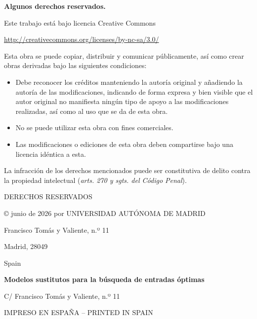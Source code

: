 \clearpage
\thispagestyle{empty}

\vspace*{1.5cm}

\begingroup
\small
\setlength{\parindent}{0pt}

\textbf{Algunos derechos reservados.}

\vspace{0.4cm}

Este trabajo está bajo licencia Creative Commons

\vspace{0.2cm}

\url{http://creativecommons.org/licenses/by-nc-sa/3.0/}

\vspace{0.4cm}

Esta obra se puede copiar, distribuir y comunicar públicamente, así como crear
obras derivadas bajo las siguientes condiciones:

\begin{itemize}
    \item Debe reconocer los créditos manteniendo la autoría original y añadiendo
    la autoría de las modificaciones, indicando de forma expresa y bien visible que
    el autor original no manifiesta ningún tipo de apoyo a las modificaciones
    realizadas, así como al uso que se da de esta obra.

    \item No se puede utilizar esta obra con fines comerciales.

    \item Las modificaciones o ediciones de esta obra deben compartirse bajo una
    licencia idéntica a esta.
\end{itemize}

La infracción de los derechos mencionados puede ser constitutiva de delito contra
la propiedad intelectual (\textit{arts. 270 y sgts. del Código Penal}).

\vspace{0.9cm}

DERECHOS RESERVADOS

\vspace{0.2cm}

\copyright{} junio de 2026 por UNIVERSIDAD AUTÓNOMA DE MADRID

Francisco Tomás y Valiente, n.º 11

Madrid, 28049

Spain

\vspace{0.9cm}

\textbf{\TFGAuthor}

\textbf{Modelos sustitutos para la búsqueda de entradas óptimas}

\vspace{0.9cm}

\textbf{\TFGAuthor}

C/ Francisco Tomás y Valiente, n.º 11

\vspace{0.9cm}

IMPRESO EN ESPAÑA -- PRINTED IN SPAIN

\endgroup

\clearpage